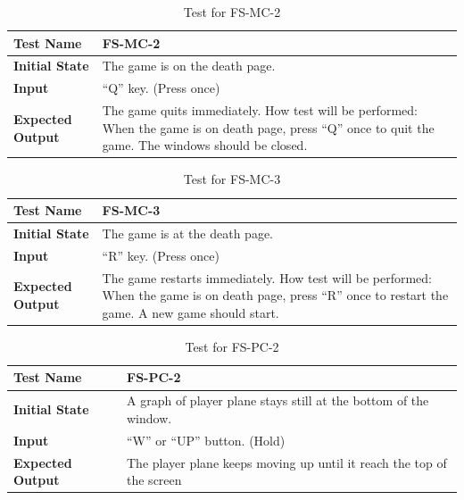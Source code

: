 \documentclass[12,english]{article}
\begin{document}
				\begin{table}[!htbp]
			
			\begin{tabularx}{\textwidth}{|l|X|}
				
				\hline
				
				\textbf{Test Name} & FS-MC-2
				\\ 
				\hline
				\textbf{Initial State} & The game is on the death page. \\ 
				\hline
				\textbf{Input} &“Q” key. (Press once) \\ 
				\hline 
				\textbf{Expected Output} & The game quits immediately.
How test will be performed: When the game is on death page, press “Q” once to quit the game. The windows should be closed. \\ 
				\hline
				
			\end{tabularx}
			\caption{Test for FS-MC-2}
			\label{Table}
		\end{table}
				\begin{table}[!htbp]
			
			\begin{tabularx}{\textwidth}{|l|X|}
				
				\hline
				
				\textbf{Test Name} & FS-MC-3
				\\ 
				\hline
				\textbf{Initial State} & The game is at the death page. \\ 
				\hline
				\textbf{Input} & “R” key. (Press once)  \\ 
				\hline 
				\textbf{Expected Output} & The game restarts immediately.
How test will be performed: When the game is on death page, press “R” once to restart the game. A new game should start. \\ 
				\hline
				
			\end{tabularx}
			\caption{Test for FS-MC-3}
			\label{Table}
		\end{table}
				\begin{table}[!htbp]
			
			\begin{tabularx}{\textwidth}{|l|X|}
				
				\hline
				
				\textbf{Test Name} & FS-PC-2
				\\ 
				\hline
				\textbf{Initial State} & A graph of player plane stays still at the bottom of the window. \\ 
				\hline
				\textbf{Input} & “W” or “UP” button. (Hold)  \\ 
				\hline 
				\textbf{Expected Output} & The player plane keeps moving up until it reach the top of the screen \\ 
				\hline
				
			\end{tabularx}
			\caption{Test for FS-PC-2}
			\label{Table}
		\end{table}
		
\end{document}
